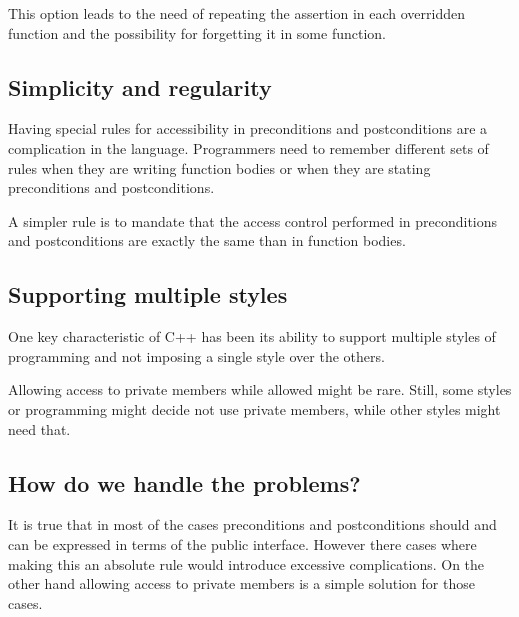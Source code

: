 This option leads to the need of repeating the assertion in each overridden
function and the possibility for forgetting it in some function. 

\subsection{Simplicity and regularity}

Having special rules for accessibility in preconditions and postconditions are a
complication in the language. Programmers need to remember different sets of
rules when they are writing function bodies or when they are stating
preconditions and postconditions.

A simpler rule is to mandate that the access control performed in preconditions
and postconditions are exactly the same than in function bodies.

\subsection{Supporting multiple styles}

One key characteristic of C++ has been its ability to support multiple styles of
programming and not imposing a single style over the others.

Allowing access to private members while allowed might be rare. Still, some
styles or programming might decide not use private members, while other styles
might need that.

\subsection{How do we handle the problems?}

It is true that in most of the cases preconditions and postconditions should and can be
expressed in terms of the public interface. However there cases where making 
this an absolute rule would introduce excessive complications. On the other hand
allowing access to private members is a simple solution for those cases.


